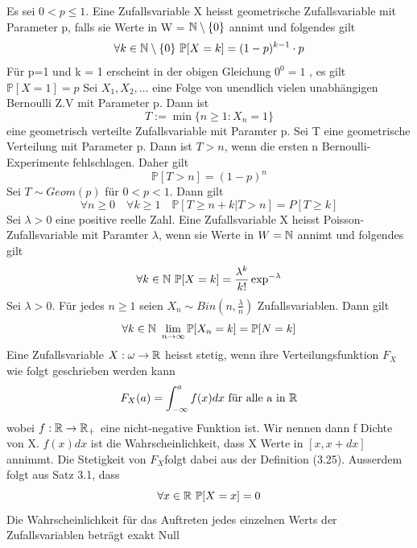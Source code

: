  \newline
Es sei \( 0 < p \leq 1\). Eine Zufallsvariable X heisst geometrische Zufallsvariable mit Parameter p, falls sie Werte in W = \( \mathbb{N} \setminus \{0\}\) annimt und folgendes gilt \[\forall k \in \N \setminus \{0\} \ \mathbb{P}[X=k] = (1-p)^{k-1} \cdot p\]
\Bem[3.16] \newline
Für p=1 und k = 1 erscheint in der obigen Gleichung \(0^0 = 1\) , es gilt \( \mathbb{P}[X=1] = p\)
\Satz[3.18] \newline
Sei \(X_1, X_2, \dots \) eine Folge von unendlich vielen unabhängigen Bernoulli Z.V mit Parameter p. Dann ist \[ T:= \min\{n \geq 1 : X_n = 1\}\] eine geometrisch verteilte Zufallsvariable mit Paramter p.
\Bem[3.18A] \newline
Sei T eine geometrische Verteilung mit Parameter p. Dann ist \( T > n\), wenn die ersten n Bernoulli-Experimente fehlschlagen. Daher gilt \[ \mathbb{P}[T > n] = (1-p)^n\]
 \newline
Sei \( T \sim Geom(p)\) für \( 0 < p < 1\). Dann gilt \[ \forall n \geq 0 \quad \forall k \geq 1 \quad \mathbb{P}[T \geq n + k | T > n] = P[T \geq k]\]
\Def[3.21] \newline
Sei \( \lambda > 0\) eine positive reelle Zahl. Eine Zufallsvariable X heisst Poisson-Zufallsvariable mit Paramter \( \lambda\), wenn sie Werte in \( W = \mathbb{N} \) annimt und folgendes gilt \[ \forall k \in \N \ \mathbb{P}[X = k] = \frac{\lambda^k}{k!}\exp^{-\lambda}\]
 \newline
Sei \( \lambda > 0\). Für jedes \( n \geq 1 \) seien \( X_n \sim Bin(n, \frac{\lambda}{n})\)  Zufallsvariablen. Dann gilt \[ \forall k \in \mathbb{N} \ \lim_{n \rightarrow \infty } \mathbb{P}[X_n = k] = \mathbb{P}[N =k]\]
 \newline
Eine Zufallsvariable \( X: \omega \rightarrow \mathbb{R} \) heisst stetig, wenn ihre Verteilungsfunktion \(F_X \) wie folgt geschrieben werden kann \[F_X(a) = \int_{-\infty}^{a} f(x)dx \ \text{für alle a in} \ \mathbb{R}\] wobei \(f: \mathbb{R} \rightarrow \mathbb{R}_+\) eine nicht-negative Funktion ist. Wir nennen dann f Dichte von X. \newline
\Bem[3.25A] \newline
\(f(x)dx \) ist die Wahrscheinlichkeit, dass X Werte in \( [x, x+ dx]\) annimmt. Die Stetigkeit von \(F_X \)folgt dabei aus der Definition (3.25). Ausserdem folgt aus Satz 3.1, dass \[ \forall x \in \mathbb{R}  \ \mathbb{P}[X = x] = 0\]Die Wahrscheinlichkeit für das Auftreten jedes einzelnen Werts der Zufallsvariablen beträgt exakt Null\newline
